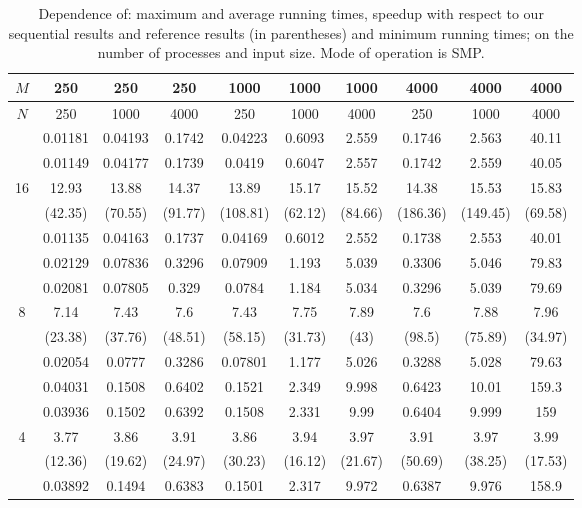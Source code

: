 \begin{table}[h]
\centering
\begin{tabular}{c|c|c|c|c|c|c|c|c|c|}
\hline
$M$ & 250 & 250 & 250 & 1000 & 1000 & 1000 & 4000 & 4000 & 4000 \\
\hline
$N$ & 250 & 1000 & 4000 & 250 & 1000 & 4000 & 250 & 1000 & 4000 \\
\hline
 & 0.01181 & 0.04193 & 0.1742 & 0.04223 & 0.6093 & 2.559 & 0.1746 & 2.563 & 40.11 \\
 & 0.01149 & 0.04177 & 0.1739 & 0.0419 & 0.6047 & 2.557 & 0.1742 & 2.559 & 40.05 \\
16 & 12.93 & 13.88 & 14.37 & 13.89 & 15.17 & 15.52 & 14.38 & 15.53 & 15.83 \\
 & (42.35) & (70.55) & (91.77) & (108.81) & (62.12) & (84.66) & (186.36) & (149.45) & (69.58) \\
 & 0.01135 & 0.04163 & 0.1737 & 0.04169 & 0.6012 & 2.552 & 0.1738 & 2.553 & 40.01 \\
\hline
 & 0.02129 & 0.07836 & 0.3296 & 0.07909 & 1.193 & 5.039 & 0.3306 & 5.046 & 79.83 \\
 & 0.02081 & 0.07805 & 0.329 & 0.0784 & 1.184 & 5.034 & 0.3296 & 5.039 & 79.69 \\
8 & 7.14 & 7.43 & 7.6 & 7.43 & 7.75 & 7.89 & 7.6 & 7.88 & 7.96 \\
 & (23.38) & (37.76) & (48.51) & (58.15) & (31.73) & (43) & (98.5) & (75.89) & (34.97) \\
 & 0.02054 & 0.0777 & 0.3286 & 0.07801 & 1.177 & 5.026 & 0.3288 & 5.028 & 79.63 \\
\hline
 & 0.04031 & 0.1508 & 0.6402 & 0.1521 & 2.349 & 9.998 & 0.6423 & 10.01 & 159.3 \\
 & 0.03936 & 0.1502 & 0.6392 & 0.1508 & 2.331 & 9.99 & 0.6404 & 9.999 & 159 \\
4 & 3.77 & 3.86 & 3.91 & 3.86 & 3.94 & 3.97 & 3.91 & 3.97 & 3.99 \\
 & (12.36) & (19.62) & (24.97) & (30.23) & (16.12) & (21.67) & (50.69) & (38.25) & (17.53) \\
 & 0.03892 & 0.1494 & 0.6383 & 0.1501 & 2.317 & 9.972 & 0.6387 & 9.976 & 158.9 \\
\hline
\end{tabular}
\caption{Dependence of: maximum and average running times, speedup with respect to our sequential results and reference results (in parentheses) and minimum running times; on the number of processes and input size. Mode of operation is SMP.}
\end{table}




